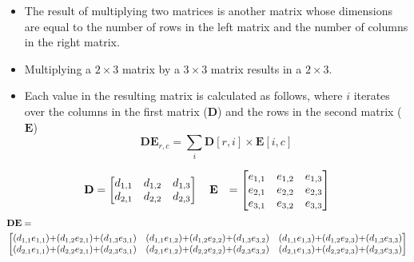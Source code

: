 \documentclass[xcolor={table}]{beamer}
\begin{document}
\begin{frame}
\begin{itemize}
	\item The result of multiplying two matrices is another matrix whose dimensions are equal to the number of rows in the left matrix and the number of columns in the right matrix. 
	\item Multiplying a $2 \times 3$ matrix by a $3 \times 3$ matrix results in a $2 \times 3$. 
	\item Each value in the resulting matrix is calculated as follows, where $i$ iterates over the columns in the first matrix ($\mathbf{D}$) and the rows in the second matrix ($\mathbf{E}$)
\begin{equation*}
\mathbf{DE}_{r,c} = \sum_i \mathbf{D}[r,i] \times \mathbf{E}[i,c]
\end{equation*} 
\end{itemize}
\end{frame}
\begin{frame}
\begin{example}
	\begin{alignat*}{2}
		\mathbf{D} &= 
		\begin{bmatrix}
			d_{1,1} & d_{1,2} & d_{1,3}\\
			d_{2,1} & d_{2,2} & d_{2,3}\\
		\end{bmatrix}
		\quad
		\mathbf{E} &= 
		\begin{bmatrix}
			e_{1,1} & e_{1,2} & e_{1,3} \\
			e_{2,1} & e_{2,2} & e_{2,3}\\
			e_{3,1} & e_{3,2} & e_{3,3}\\
		\end{bmatrix} \notag\\
	\end{alignat*}
	{\tiny
	\begin{alignat*}{2}
		&\mathbf{DE} = \\
		&\begin{bmatrix}
			(d_{1,1} e_{1,1}) {+}  (d_{1,2} e_{2,1}) {+}  (d_{1,3} e_{3,1}) &  
			(d_{1,1} e_{1,2}) {+}  (d_{1,2} e_{2,2}) {+}  (d_{1,3} e_{3,2}) &
			(d_{1,1} e_{1,3}) {+}  (d_{1,2} e_{2,3}) {+}  (d_{1,3} e_{3,3}) \\
			(d_{2,1} e_{1,1}) {+}  (d_{2,2} e_{2,1}) {+}  (d_{2,3} e_{3,1}) &  
			(d_{2,1} e_{1,2}) {+}  (d_{2,2} e_{2,2}) {+}  (d_{2,3} e_{3,2}) &
			(d_{2,1} e_{1,3}) {+}  (d_{2,2} e_{2,3}) {+}  (d_{2,3} e_{3,3}) \\
		\end{bmatrix} \notag\\
	\end{alignat*}
	}
\end{example}
\end{frame}
\end{document}

